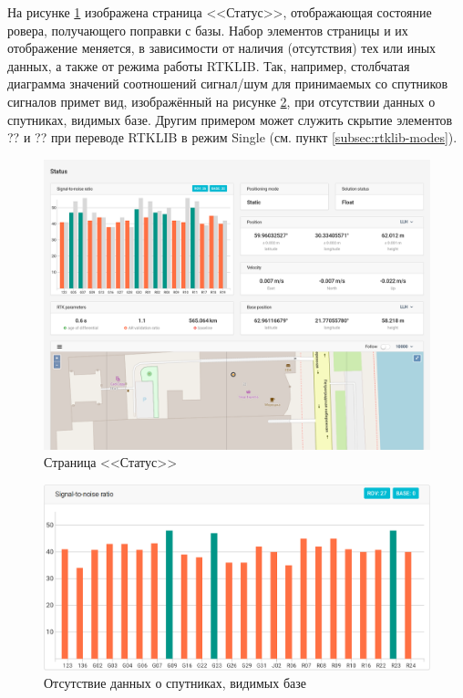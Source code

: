 На рисунке \ref{fig:status-detailed} изображена страница <<Статус>>, отображающая состояние ровера, получающего поправки с базы. Набор элементов страницы и их отображение меняется, в зависимости от наличия (отсутствия) тех или иных данных, а также от режима работы RTKLIB. Так, например, столбчатая диаграмма значений соотношений сигнал/шум для принимаемых со спутников сигналов примет вид, изображённый на рисунке \ref{fig:status-snr-rover}, при отсутствии данных о спутниках, видимых базе. Другим примером может служить скрытие элементов ?? и ?? при переводе RTKLIB в режим Single (см. пункт \ref{subsec:rtklib-modes}).

\begin{figure}[h!]
  \centering
  \setlength{\fboxsep}{5pt}
  \includegraphics[width=.9\textwidth]{img/reachview/status_content_laptop}
  \vspace*{6pt}
  \caption{Страница <<Статус>>}
  \label{fig:status-detailed}
\end{figure}

\begin{figure}[h!]
  \centering
  \setlength{\fboxsep}{5pt}
  \includegraphics[width=.9\textwidth]{img/reachview/status_snr_rover}
  \vspace*{6pt}
  \caption{Отсутствие данных о спутниках, видимых базе}
  \label{fig:status-snr-rover}
\end{figure}


